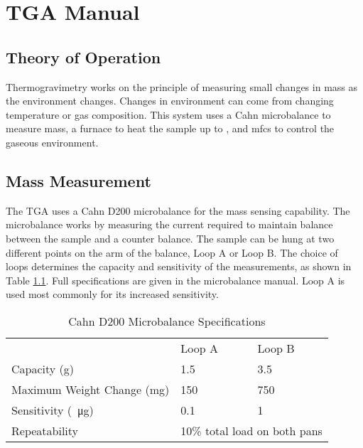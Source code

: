 

\chapter{TGA Manual}
\label{app:TGA}
\section{Theory of Operation}
Thermogravimetry works on the principle of measuring small changes in mass as the environment changes.
Changes in environment can come from changing temperature or gas composition.
This system uses a Cahn microbalance to measure mass, a furnace to heat the sample up to , and \glspl{mfc} to control the gaseous environment.

\section{Mass Measurement}
    The TGA uses a Cahn D200 microbalance for the mass sensing capability.
    The microbalance works by measuring the current required to maintain balance between the sample and a counter balance.
    The sample can be hung at two different points on the arm of the balance, Loop A or Loop B.
    The choice of loops determines the capacity and sensitivity of the measurements, as shown in Table \ref{tab:tga}.
    Full specifications are given in the microbalance manual.
    Loop A is used most commonly for its increased sensitivity.

    \begin{table}
    \centering
    \caption{Cahn D200 Microbalance Specifications}
    \label{tab:tga}
    \begin{tabular}{lll}
                               & Loop A & Loop B                                   \\
    \cline{2-3}
    Capacity (g)               & 1.5    & 3.5                                      \\
    Maximum Weight Change (mg) & 150    & 750                                      \\
    Sensitivity (\SI{}{\micro\gram})           & 0.1    & 1                                        \\
    Repeatability              & \multicolumn{2}{l}{10\% total load on both pans}
    \end{tabular}
    \end{table}

